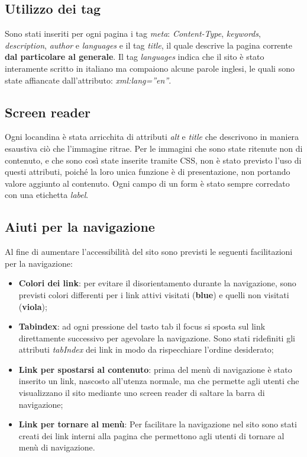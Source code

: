 \documentclass[../Relazione.tex]{subfiles}
\begin{document}
\newpage
\subsection{Utilizzo dei tag}

Sono stati inseriti per ogni pagina i tag \textit{meta}: \textit{Content-Type}, \textit{keywords}, \textit{description}, \textit{author} e \textit{languages} e il tag \textit{title}, il quale descrive la pagina corrente \textbf{dal particolare al generale}. Il tag \textit{languages} indica che il sito è stato interamente scritto in italiano ma compaiono alcune parole inglesi, le quali sono state affiancate dall’attributo: \textit{xml:lang=”en”}.

\subsection{Screen reader}

Ogni locandina è stata arricchita di attributi \textit{alt} e \textit{title} che descrivono in maniera esaustiva ciò che l'immagine ritrae. Per le immagini che sono state ritenute non di contenuto, e che sono così state inserite tramite CSS, non è stato previsto l'uso di questi attributi, poiché la loro unica funzione è di presentazione, non portando valore aggiunto al contenuto.
Ogni campo di un form è stato sempre corredato con una etichetta \textit{label}.

\subsection{Aiuti per la navigazione}

Al fine di aumentare l'accessibilità del sito sono previsti le seguenti facilitazioni per la navigazione:

\begin{itemize}
\item \textbf{Colori dei link}: per evitare il disorientamento durante la navigazione, sono previsti colori differenti per i link attivi visitati (\textbf{blue}) e quelli non visitati (\textbf{viola});
\item \textbf{Tabindex}: ad ogni pressione del tasto tab il focus si sposta sul link direttamente successivo per agevolare la navigazione. Sono stati ridefiniti gli attributi \textit{tabIndex} dei link in modo da rispecchiare l'ordine desiderato;
\item \textbf{Link per spostarsi al contenuto}: prima del menù di navigazione è stato inserito un link, nascosto all'utenza normale, ma che permette agli utenti che visualizzano il sito mediante uno screen reader di saltare la barra di navigazione;
\item \textbf{Link per tornare al menù}: Per facilitare la navigazione nel sito sono stati creati dei link interni alla pagina che permettono agli utenti di tornare al menù di navigazione.

\end{itemize}
\end{document}
